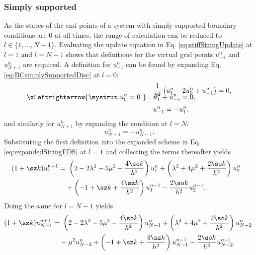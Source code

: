 \subsubsection{Simply supported}
As the states of the end points of a system with simply supported boundary conditions are $0$ at all times, the range of calculation can be reduced to $l\in \{ 1, \hdots, N-1\}$. Evaluating the update equation in Eq. \eqref{eq:stiffStringUpdate} at $l=1$ and $l=N-1$ shows that definitions for the virtual grid points $u_{-1}^n$ and $u_{N+1}^n$ are required. A definition for $u_{-1}^n$ can be found by expanding Eq. \eqref{eq:BCsimplySupportedDisc} at $l = 0$:
\begin{align}
    &\frac{1}{h^2}\left(u_1^n - 2 u_0^n + u_{-1}^n\right) = 0,\nonumber\\[-1em]
    \xLeftrightarrow{\mystrut\ u^n_0 = 0\ } \quad & u_1^n + u_{-1}^n = 0,\nonumber\\[0.25em]
    &u_{-1}^n = -u_1^n,\label{eq:simplySupportedResult}
\end{align}
and similarly for $u_{N+1}^n$ by expanding the condition at $l=N$:
\begin{equation*}
    u_{N+1}^n = -u_{N-1}^n.
\end{equation*}
Substituting the first definition into the expanded scheme in Eq. \eqref{eq:expandedStringFDS} at $l=1$ and collecting the terms thereafter yields
\begin{equation}
    \begin{aligned}
        \!\!\!\!\!(1+\sz k) u_1^{n+1} =&\ \left(2 - 2\lambda^2 - 5\mu^2 - \frac{4\so k}{h^2}\right) u_1^n + \left(\lambda^2 + 4\mu^2 + \frac{2\so k}{h^2}\right) u_{2}^n \\
        &+ \left(-1+\sz k + \frac{4\sz k}{h^2}\right)u_1^{n-1} - \frac{2\so k}{h^2}u_{2}^{n-1}.
    \end{aligned}
\end{equation}
Doing the same for $l=N-1$ yields
\begin{equation}
    \begin{aligned}
        \!\!(1+\sz k) u_{N-1}^{n+1} =&\ \left(2 - 2\lambda^2 - 5\mu^2 - \frac{4\so k}{h^2}\right) u_{N-1}^n + \left(\lambda^2 + 4\mu^2 + \frac{2\so k}{h^2}\right) u_{N-2}^n \\
        &-\mu^2u_{N-3}^n+ \left(-1+\sz k + \frac{4\sz k}{h^2}\right)u_{N-1}^{n-1} - \frac{2\so k}{h^2}u_{N-2}^{n-1}.
    \end{aligned}
\end{equation}

